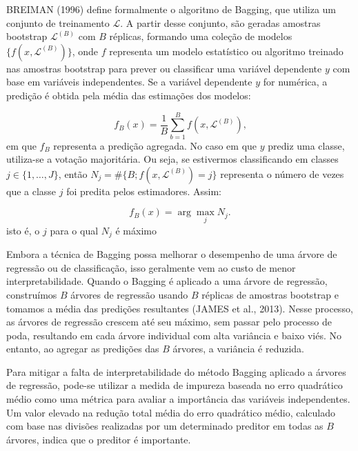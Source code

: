 \documentclass[
  12pt,
  a4paper,
]{scrreprt}
\begin{document}
\vspace{12pt}

BREIMAN (1996) define formalmente o algoritmo de Bagging, que utiliza um
conjunto de treinamento \(\mathcal{L}\). A partir desse conjunto, são
geradas amostras bootstrap \(\mathcal{L}^{(B)}\) com \(B\) réplicas,
formando uma coleção de modelos \(\{f(x, \mathcal{L}^{(B)})\}\), onde
\(f\) representa um modelo estatístico ou algoritmo treinado nas
amostras bootstrap para prever ou classificar uma variável dependente
\(y\) com base em variáveis independentes. Se a variável dependente
\(y\) for numérica, a predição é obtida pela média das estimações dos
modelos:

\[
f_{B}\left(x\right) = \frac{1}{B} \sum_{b = 1}^B f \left(x, \mathcal{L}^{\left(B\right)}\right)\text{,}
\] em que \(f_{B}\) representa a predição agregada. No caso em que \(y\)
prediz uma classe, utiliza-se a votação majoritária. Ou seja, se
estivermos classificando em classes \(j \in \{1, \dots, J\}\), então
\(N_j = \#\{B; f(x, \mathcal{L}^{(B)}) = j\}\) representa o número de
vezes que a classe \(j\) foi predita pelos estimadores. Assim:

\[
f_{B}\left(x\right) = \arg \max_{j} N_j\text{.}
\] isto é, o \(j\) para o qual \(N_j\) é máximo

\vspace{12pt}

Embora a técnica de Bagging possa melhorar o desempenho de uma árvore de
regressão ou de classificação, isso geralmente vem ao custo de menor
interpretabilidade. Quando o Bagging é aplicado a uma árvore de
regressão, construímos \(B\) árvores de regressão usando \(B\) réplicas
de amostras bootstrap e tomamos a média das predições resultantes (JAMES
et al., 2013). Nesse processo, as árvores de regressão crescem até seu
máximo, sem passar pelo processo de poda, resultando em cada árvore
individual com alta variância e baixo viés. No entanto, ao agregar as
predições das \(B\) árvores, a variância é reduzida.

\vspace{12pt}

Para mitigar a falta de interpretabilidade do método Bagging aplicado a
árvores de regressão, pode-se utilizar a medida de impureza baseada no
erro quadrático médio como uma métrica para avaliar a importância das
variáveis independentes. Um valor elevado na redução total média do erro
quadrático médio, calculado com base nas divisões realizadas por um
determinado preditor em todas as \(B\) árvores, indica que o preditor é
importante.
\end{document}
